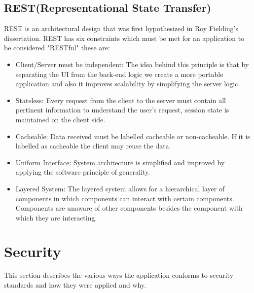 \subsection{REST(Representational State Transfer)}
REST is an architectural design that was first hypothesized in Roy Fielding's dissertation\cite{Fielding}.  REST has six constraints which must be met for an application to be considered "RESTful" these are:
\begin{itemize}
  \item Client/Server must be independent: The idea behind this principle is that by separating the UI from the back-end logic we create a more portable application and also it improves scalability by simplifying the server logic.
  \item Stateless:  Every request from the client to the server must contain all pertinent information to understand the user's request, session state is maintained on the client side.
  \item Cacheable: Data received must be labelled cacheable or non-cacheable.  If it is labelled as cacheable the client may reuse the data.
  \item Uniform Interface: System architecture is simplified and improved by applying the software principle of generality.
  \item Layered System: The layered system allows for a hierarchical layer of components in which components can interact with certain components.  Components are unaware of other components besides the component with which they are interacting.
\end{itemize}
\section{Security}
This section describes the various ways the application conforms to security standards and how they were applied and why.
